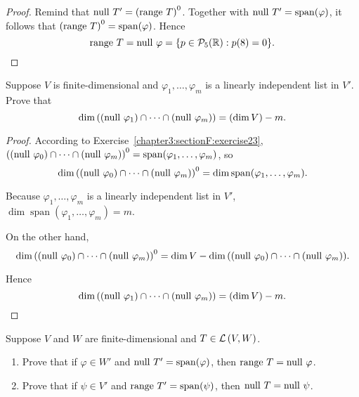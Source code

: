 \begin{proof}
    Remind that $\operatorname{null}\,{T'} = {(\operatorname{range}\,{T})}^{0}$. Together with $\operatorname{null}\,{T'} = \operatorname{span}(\varphi)$, it follows that ${(\operatorname{range}\,{T})}^{0} = \operatorname{span}(\varphi)$. Hence
    \[
        \operatorname{range}\,{T} = \operatorname{null}\,{\varphi} = \{ p\in\mathcal{P}_{5}(\mathbb{R}): p(8) = 0 \}.\qedhere
    \]
\end{proof}
\newpage

\begin{exercise}\label{chapter3:sectionF:exercise28}
    Suppose $V$ is finite-dimensional and $\varphi_{1}, \ldots, \varphi_{m}$ is a linearly independent list in $V'$. Prove that
    \[
        \dim\left( (\operatorname{null}\,{\varphi_{1}})\cap \cdots \cap (\operatorname{null}\,{\varphi_{m}}) \right) = (\dim V) - m.
    \]
\end{exercise}

\begin{proof}
    According to Exercise~\ref{chapter3:sectionF:exercise23}, ${\left((\operatorname{null}\,{\varphi_{0}})\cap\cdots\cap(\operatorname{null}\,{\varphi_{m}})\right)}^{0} = \operatorname{span}(\varphi_{1}, \ldots, \varphi_{m})$, so
    \[
        \dim {\left((\operatorname{null}\,{\varphi_{0}})\cap\cdots\cap(\operatorname{null}\,{\varphi_{m}})\right)}^{0} = \dim  \operatorname{span}(\varphi_{1}, \ldots, \varphi_{m}).
    \]

    Because  $\varphi_{1}, \ldots, \varphi_{m}$ is a linearly independent list in $V'$, $\dim  \operatorname{span}(\varphi_{1}, \ldots, \varphi_{m}) = m$.

    On the other hand,
    \[
        \dim {\left((\operatorname{null}\,{\varphi_{0}})\cap\cdots\cap(\operatorname{null}\,{\varphi_{m}})\right)}^{0} = \dim V -  \dim {\left((\operatorname{null}\,{\varphi_{0}})\cap\cdots\cap(\operatorname{null}\,{\varphi_{m}})\right)}.
    \]

    Hence
    \[
        \dim\left( (\operatorname{null}\,{\varphi_{1}})\cap \cdots \cap (\operatorname{null}\,{\varphi_{m}}) \right) = (\dim V) - m.\qedhere
    \]
\end{proof}
\newpage

\begin{exercise}\label{chapter3:sectionF:exercise29}
    Suppose $V$ and $W$ are finite-dimensional and $T\in\mathcal{L}\left({V, W}\right)$.
    \begin{enumerate}[label={(\alph*)}]
        \item Prove that if $\varphi\in W'$ and $\operatorname{null}\,{T'} = \operatorname{span}(\varphi)$, then $\operatorname{range}\,{T} = \operatorname{null}\,{\varphi}$.
        \item Prove that if $\psi\in V'$ and $\operatorname{range}\,{T'} = \operatorname{span}(\psi)$, then $\operatorname{null}\,{T} = \operatorname{null}\,{\psi}$.
    \end{enumerate}
\end{exercise}

